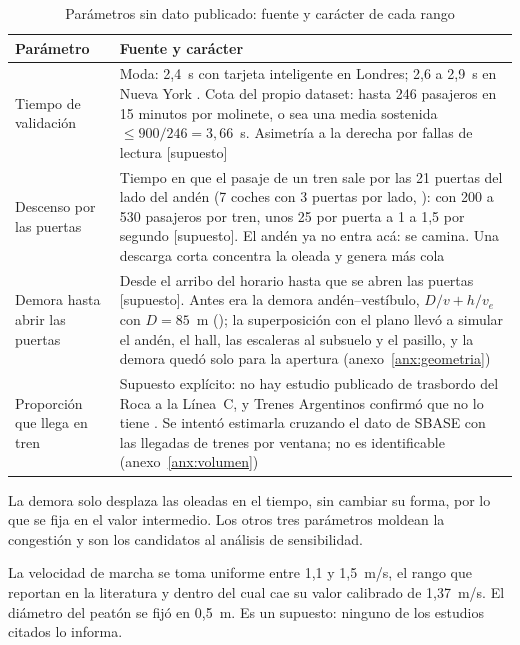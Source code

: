 \begin{table}[H]
\centering
\caption{Parámetros sin dato publicado: fuente y carácter de cada rango}
\label{tab:parametros-fuentes}
\small
\begin{tabularx}{\textwidth}{@{}>{\raggedright\arraybackslash}p{3.0cm} X@{}}
\toprule
Parámetro & Fuente y carácter \\
\midrule
Tiempo de validación &
Moda: 2,4~s con tarjeta inteligente en Londres; 2,6 a 2,9~s en Nueva York \parencite[Exh.~10-27]{tcqsm2013}.
Cota del propio dataset: hasta 246 pasajeros en 15 minutos por molinete, o sea una media sostenida
$\le 900/246 = 3{,}66$~s. Asimetría a la derecha por fallas de lectura [supuesto] \\
Descenso por las puertas &
Tiempo en que el pasaje de un tren sale por las 21 puertas del lado del andén (7 coches con 3 puertas
por lado, \cite{wikicsr}): con 200 a 530 pasajeros por tren, unos 25 por puerta a 1 a 1,5 por segundo
[supuesto]. El andén ya no entra acá: se camina. Una descarga corta concentra la oleada y genera más cola \\
Demora hasta abrir las puertas &
Desde el arribo del horario hasta que se abren las puertas [supuesto]. Antes era la demora andén--vestíbulo,
$D/v + h/v_e$ con $D = 85$~m (\cite{osm2026}); la superposición con el plano llevó a simular el andén, el
hall, las escaleras al subsuelo y el pasillo, y la demora quedó solo para la apertura (anexo~\ref{anx:geometria}) \\
Proporción que llega en tren &
Supuesto explícito: no hay estudio publicado de trasbordo del Roca a la Línea~C, y Trenes Argentinos
confirmó que no lo tiene \parencite{sofse2026nota}. Se intentó estimarla cruzando el dato de SBASE con
las llegadas de trenes por ventana; no es identificable (anexo~\ref{anx:volumen}) \\
\bottomrule
\end{tabularx}
\end{table}

La demora solo desplaza las oleadas en el tiempo, sin cambiar su forma, por lo que se fija en el valor
intermedio. Los otros tres parámetros moldean la congestión y son los candidatos al análisis de
sensibilidad.

La velocidad de marcha se toma uniforme entre 1,1 y 1,5~m/s, el rango que \textcite{li2024} reportan en
la literatura y dentro del cual cae su valor calibrado de 1,37~m/s. El diámetro del peatón se fijó en 0,5~m.
Es un supuesto: ninguno de los estudios citados lo informa.

